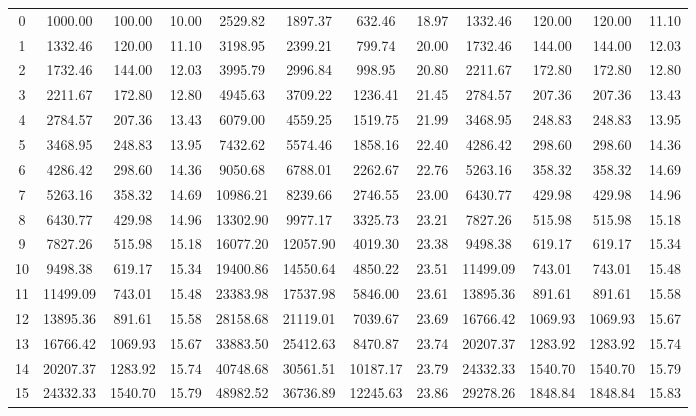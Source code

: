 \documentclass[12pt]{article}
\begin{document}
\begin{table}[H]
{\begin{tabular}{c|ccccccccccc}
    0  & 1000.00  & 100.00  & 10.00  & 2529.82  & 1897.37  & 632.46  & 18.97  & 1332.46  & 120.00  & 120.00  & 11.10 \\
    1  & 1332.46  & 120.00  & 11.10  & 3198.95  & 2399.21  & 799.74  & 20.00  & 1732.46  & 144.00  & 144.00  & 12.03 \\
    2  & 1732.46  & 144.00  & 12.03  & 3995.79  & 2996.84  & 998.95  & 20.80  & 2211.67  & 172.80  & 172.80  & 12.80 \\
    3  & 2211.67  & 172.80  & 12.80  & 4945.63  & 3709.22  & 1236.41 & 21.45  & 2784.57  & 207.36  & 207.36  & 13.43 \\
    4  & 2784.57  & 207.36  & 13.43  & 6079.00  & 4559.25  & 1519.75 & 21.99  & 3468.95  & 248.83  & 248.83  & 13.95 \\
    5  & 3468.95  & 248.83  & 13.95  & 7432.62  & 5574.46  & 1858.16 & 22.40  & 4286.42  & 298.60  & 298.60  & 14.36 \\
    6  & 4286.42  & 298.60  & 14.36  & 9050.68  & 6788.01  & 2262.67 & 22.76  & 5263.16  & 358.32  & 358.32  & 14.69 \\
    7  & 5263.16  & 358.32  & 14.69  & 10986.21 & 8239.66  & 2746.55 & 23.00  & 6430.77  & 429.98  & 429.98  & 14.96 \\
    8  & 6430.77  & 429.98  & 14.96  & 13302.90 & 9977.17  & 3325.73 & 23.21  & 7827.26  & 515.98  & 515.98  & 15.18 \\
    9  & 7827.26  & 515.98  & 15.18  & 16077.20 & 12057.90 & 4019.30 & 23.38  & 9498.38  & 619.17  & 619.17  & 15.34 \\
    10 & 9498.38  & 619.17  & 15.34  & 19400.86 & 14550.64 & 4850.22 & 23.51  & 11499.09 & 743.01  & 743.01  & 15.48 \\
    11 & 11499.09 & 743.01  & 15.48  & 23383.98 & 17537.98 & 5846.00 & 23.61  & 13895.36 & 891.61  & 891.61  & 15.58 \\
    12 & 13895.36 & 891.61  & 15.58  & 28158.68 & 21119.01 & 7039.67 & 23.69  & 16766.42 & 1069.93 & 1069.93 & 15.67 \\
    13 & 16766.42 & 1069.93 & 15.67  & 33883.50 & 25412.63 & 8470.87 & 23.74  & 20207.37 & 1283.92 & 1283.92 & 15.74 \\
    14 & 20207.37 & 1283.92 & 15.74  & 40748.68 & 30561.51 & 10187.17& 23.79  & 24332.33 & 1540.70 & 1540.70 & 15.79 \\
    15 & 24332.33 & 1540.70 & 15.79  & 48982.52 & 36736.89 & 12245.63& 23.86  & 29278.26 & 1848.84 & 1848.84 & 15.83 \\
    \hline

    \end{tabular}}
    \end{table}
\end{document}
